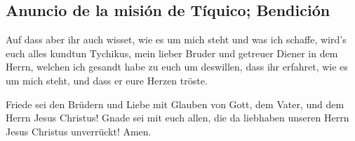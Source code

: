 \hypertarget{anuncio-de-la-misiuxf3n-de-tuxedquico-bendiciuxf3n}{%
\subsection{Anuncio de la misión de Tíquico;
Bendición}\label{anuncio-de-la-misiuxf3n-de-tuxedquico-bendiciuxf3n}}

 Auf dass aber ihr auch wisset, wie es um mich steht und
was ich schaffe, wird's euch alles kundtun Tychikus, mein lieber Bruder
und getreuer Diener in dem Herrn,  welchen ich gesandt
habe zu euch um deswillen, dass ihr erfahret, wie es um mich steht, und
dass er eure Herzen tröste.

 Friede sei den Brüdern und Liebe mit Glauben von Gott,
dem Vater, und dem Herrn Jesus Christus!  Gnade sei mit
euch allen, die da liebhaben unseren Herrn Jesus Christus unverrückt!
Amen.
